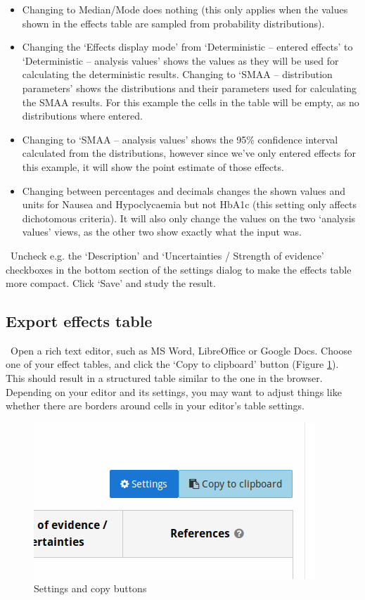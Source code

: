 \documentclass[00_mcda_tutorial.tex]{subfiles}
\begin{document}
\begin{itemize}
\item Changing to Median/Mode does nothing (this only applies when the values shown in the effects table are sampled from probability distributions).
\item Changing the ‘Effects display mode’ from ‘Deterministic – entered effects’ to ‘Deterministic – analysis values’ shows the values as they will be used for calculating the deterministic results. 
Changing to ‘SMAA – distribution parameters’ shows the distributions and their parameters used for calculating the SMAA results. For this example the cells in the table will be empty, as no distributions where entered.
\item Changing to ‘SMAA – analysis values’ shows the 95\% confidence interval calculated from the distributions, however since we’ve only entered effects for this example, it will show the point estimate of those effects.
\item Changing between percentages and decimals changes the shown values and units for Nausea and Hypoclycaemia but not HbA1c (this setting only affects dichotomous criteria). It will also only change the values on the two ‘analysis values’ views, as the other two show exactly what the input was.
\end{itemize}

\noindent \leftpointright \, Uncheck e.g. the ‘Description’ and ‘Uncertainties / Strength of evidence’ checkboxes in the bottom section of the settings dialog to make the effects table more compact. Click ‘Save’ and study the result.

\subsection*{Export effects table}
\noindent \leftpointright \, Open a rich text editor, such as MS Word, LibreOffice or Google Docs. Choose one of your effect tables, and click the ‘Copy to clipboard’ button (Figure \ref{fig:clipboard_button}). This should result in a structured table similar to the one in the browser. Depending on your editor and its settings, you may want to adjust things like whether there are borders around cells in your editor’s table settings.

\begin{figure}[!h]
    \centering
	\includegraphics[width=.5\textwidth]{fig/clipboardButton.png}
    \caption{Settings and copy buttons}
	\label{fig:clipboard_button}
\end{figure}
\end{document}
